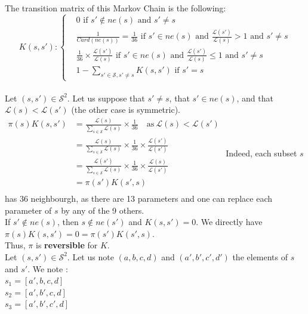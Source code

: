 The transition matrix of this Markov Chain is the following: 
\[
K(s, s'): \left\{
\begin{aligned}
& 0 \text{ if } s' \notin ne(s) \text{ and } s' \neq s   \\
& \frac{1}{Card(ne(s))} = \frac{1}{36} \text{ if } s' \in ne(s) \text{ and } \frac{\mathcal{L}(s')}{\mathcal{L}(s)} > 1 \text{ and } s' \neq s \\
& \frac{1}{36} \times \frac{\mathcal{L}(s')}{\mathcal{L}(s)} \text{ if } s' \in ne(s) \text{ and } \frac{\mathcal{L}(s')}{\mathcal{L}(s)} \leq 1  \text{ and } s' \neq s  \\
& 1 - \sum_{s' \in \mathcal{S}, s' \neq s}K(s, s') \text{ if } s' = s 
\end{aligned}
\right.
\]
\\[0.3cm]

Let $(s, s') \in \mathcal{S}^2$. Let us suppose that $ s' \neq s$, that  $s' \in ne(s)$, and that $\mathcal{L}(s) < \mathcal{L}(s')$ (the other case is symmetric). \\[0.15cm]
$
\begin{aligned}
    \pi(s)K(s, s') &=  \frac{\mathcal{L}(s)}{\sum_{s \in \mathcal{S}} \mathcal{L}(s)} \times \frac{1}{36} \quad \text{as} \ \mathcal{L}(s) < \mathcal{L}(s') \\
    &=  \frac{\mathcal{L}(s)}{\sum_{s \in \mathcal{S}} \mathcal{L}(s)} \times \frac{1}{36} \times \frac{\mathcal{L}(s')}{\mathcal{L}(s')} \\
    &=  \frac{\mathcal{L}(s')}{\sum_{s \in \mathcal{S}} \mathcal{L}(s)} \times \frac{1}{36} \times \frac{\mathcal{L}(s)}{\mathcal{L}(s')} \\
    &= \pi(s')K(s', s)\\[0.3cm]
\end{aligned}
$
\newline
Indeed, each subset $s$ has 36 neighbourgh, as there are 13 parameters and one can replace each parameter of $s$ by any of the 9 others. \\

If $s' \notin ne(s)$, then $s \notin ne(s')$ and $K(s, s') = 0$.
We directly have $\pi(s)K(s, s') = 0 = \pi(s')K(s', s)$.\\

Thus, $\pi$ is \textbf{reversible} for $K$.\\[0.3cm]
Let $(s, s') \in \mathcal{S}^2$. Let us note $(a, b, c, d)$ and $(a', b', c', d')$ the elements of $s$ and $s'$.
We note : \\
$s_1 = [a', b, c, d]$\\
$ s_2 = [a', b', c, d]$ \\
$s_3 = [a', b', c', d]$ \\


